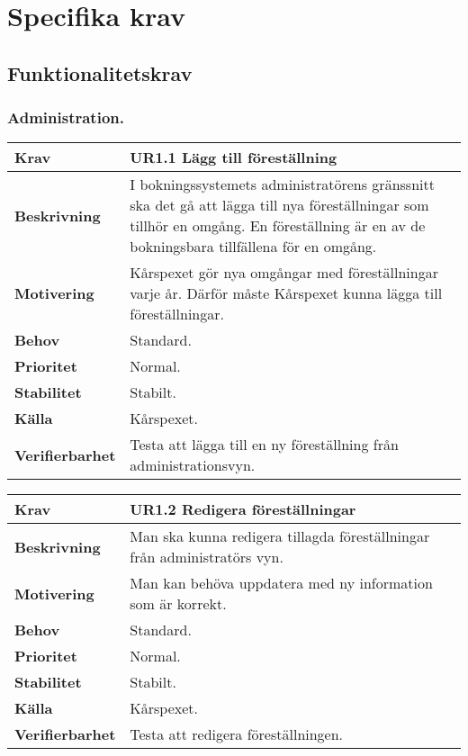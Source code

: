 \documentclass[a4paper, twoside, 11pt, titlepage]{article}
\begin{document}
\clearpage
\section{Specifika krav}



	\subsection{Funktionalitetskrav}



		\subsubsection{Administration.}


		\begin{tabular} { p{2.6cm} p{12.5cm} }
			\hline
			\sffamily\textbf{Krav} & \sffamily\textbf{UR1.1 Lägg till föreställning  } \\
			\hline
			\sffamily\textbf{Beskrivning} & I bokningssystemets administratörens gränssnitt ska det gå att lägga till nya föreställningar som tillhör en omgång. En föreställning är en av de bokningsbara tillfällena för en omgång.  \\
			\hline
			\sffamily\textbf{Motivering} & Kårspexet gör nya omgångar med föreställningar varje år. Därför måste Kårspexet kunna lägga till föreställningar.  \\
			\hline
			\sffamily\textbf{Behov} & Standard.  \\
			\hline
			\sffamily\textbf{Prioritet} & Normal.  \\
			\hline
			\sffamily\textbf{Stabilitet} & Stabilt.  \\
			\hline
			\sffamily\textbf{Källa} & Kårspexet.  \\
			\hline
			\sffamily\textbf{Verifierbarhet} & Testa att lägga till en ny föreställning från administrationsvyn.  \\
			\hline
		\end{tabular}
		\vspace{6mm}

		\begin{tabular} { p{2.6cm} p{12.5cm} }
			\hline
			\sffamily\textbf{Krav} & \sffamily\textbf{UR1.2 Redigera föreställningar  } \\
			\hline
			\sffamily\textbf{Beskrivning} & Man ska kunna redigera tillagda föreställningar från administratörs vyn.  \\
			\hline
			\sffamily\textbf{Motivering} & Man kan behöva uppdatera med ny information som är korrekt.  \\
			\hline
			\sffamily\textbf{Behov} & Standard.  \\
			\hline
			\sffamily\textbf{Prioritet} & Normal.  \\
			\hline
			\sffamily\textbf{Stabilitet} & Stabilt.  \\
			\hline
			\sffamily\textbf{Källa} & Kårspexet.  \\
			\hline
			\sffamily\textbf{Verifierbarhet} & Testa att redigera föreställningen.  \\
			\hline
		\end{tabular}
		\vspace{6mm}
\end{document}
